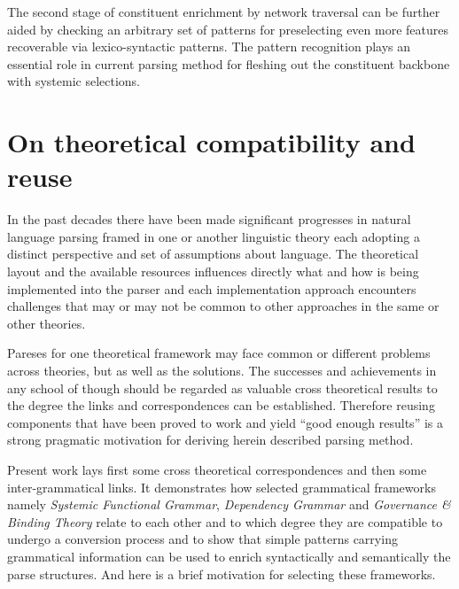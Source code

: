 The second stage of constituent enrichment by network traversal can be further aided by checking an arbitrary set of patterns for preselecting even more features recoverable via lexico-syntactic patterns.
The pattern recognition plays an essential role in current parsing method for fleshing out the constituent backbone with systemic selections.

\section{On theoretical compatibility and reuse}
\label{sec:reuse}
In the past decades there have been made significant progresses in natural language parsing framed in one or another linguistic theory each adopting a distinct perspective and set of assumptions about language. The theoretical layout and the available resources influences directly what and how is being implemented into the parser and each implementation approach encounters challenges that may or may not be common to other approaches in the same or other theories. 

Pareses for one theoretical framework may face common or different problems across theories, but as well as the solutions. The successes and achievements in any school of though should be regarded as valuable cross theoretical results to the degree the links and correspondences can be established. Therefore reusing components that have been proved to work and yield ``good enough results'' is a strong pragmatic motivation for deriving herein described parsing method.

Present work lays first some cross theoretical correspondences and then some inter-grammatical links.
It demonstrates how selected grammatical frameworks namely \textit{Systemic Functional Grammar}, \textit{Dependency Grammar} and \textit{Governance \& Binding Theory} relate to each other and to which degree they are compatible to undergo a conversion process and to show that simple patterns carrying grammatical information can be used to enrich syntactically and semantically the parse structures. And here is a brief motivation for selecting these frameworks.   

